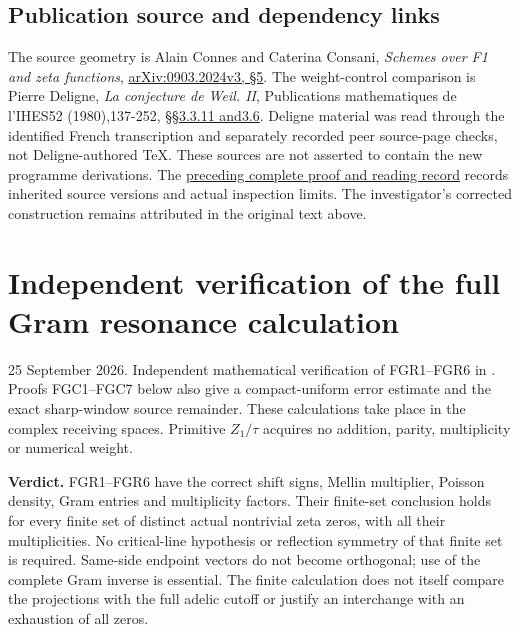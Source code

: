 \section{Publication source and dependency
links}\label{publication-source-and-dependency-links-13}

The source geometry is Alain Connes and Caterina Consani, \emph{Schemes
over F1 and zeta functions},
\href{https://arxiv.org/abs/0903.2024v3}{arXiv:0903.2024v3, §5}. The
weight-control comparison is Pierre Deligne, \emph{La conjecture de
Weil. II}, Publications mathematiques de l'IHES52 (1980),137-252,
\href{https://www.numdam.org/item/PMIHES_1980__52__137_0/}{§§3.3.11
and3.6}. Deligne material was read through the identified French
transcription and separately recorded peer source-page checks, not
Deligne-authored TeX. These sources are not asserted to contain the new
programme derivations. The
\href{https://github.com/KokunoYumeto/zeta-function-research-reader/blob/36a82ecca98addb8a98b48204e349737856c7223/workbenches/splitzero-tandem/continuations/20260924-cohomology-weight-and-character-lifts/BUILD_AND_REVIEW.md}{preceding
complete proof and reading record} records inherited source versions and
actual inspection limits. The investigator's corrected construction
remains attributed in the original text above.

\chapter{Independent verification of the full Gram resonance
calculation}\label{independent-verification-of-the-full-gram-resonance-calculation}

25 September 2026. Independent mathematical verification of FGR1--FGR6
in
\href{https://github.com/KokunoYumeto/zeta-function-research-reader/blob/main/workbenches/splitzero-tandem/continuations/20260925-full-source-tensor-and-original-divisor/counterfactual/FULL_GRAM_RESONANCE_RETURN.md}{}.
Proofs FGC1--FGC7 below also give a compact-uniform error estimate and
the exact sharp-window source remainder. These calculations take place
in the complex receiving spaces. Primitive \(Z_1/\tau\) acquires no
addition, parity, multiplicity or numerical weight.

\textbf{Verdict.} FGR1--FGR6 have the correct shift signs, Mellin
multiplier, Poisson density, Gram entries and multiplicity factors.
Their finite-set conclusion holds for every finite set of distinct
actual nontrivial zeta zeros, with all their multiplicities. No
critical-line hypothesis or reflection symmetry of that finite set is
required. Same-side endpoint vectors do not become orthogonal; use of
the complete Gram inverse is essential. The finite calculation does not
itself compare the projections with the full adelic cutoff or justify an
interchange with an exhaustion of all zeros.

